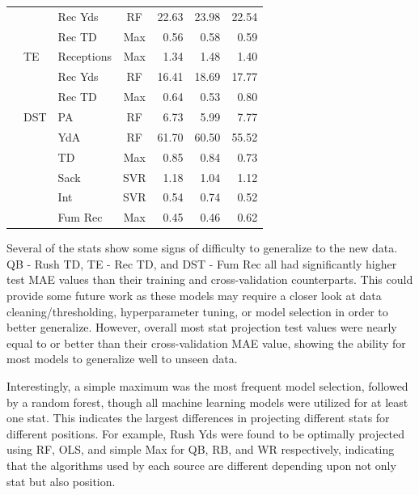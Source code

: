 \documentclass[12pt]{article}
\begin{document}
\begin{table}[H]
\begin{tabular}{lllcrrr}
{} &       {} &     Rec Yds &                  RF &  22.63 &  23.98 &  22.54 \\
{} &       {} &      Rec TD &                 Max &   0.56 &   0.58 &   0.59 \\
\midrule
{} &       TE &  Receptions &                 Max &   1.34 &   1.48 &   1.40 \\
{} &       {} &     Rec Yds &                  RF &  16.41 &  18.69 &  17.77 \\
{} &       {} &      Rec TD &                 Max &   0.64 &   0.53 &   0.80 \\
\midrule
{} &      DST &          PA &                  RF &   6.73 &   5.99 &   7.77 \\
{} &       {} &         YdA &                  RF &  61.70 &  60.50 &  55.52 \\
{} &       {} &          TD &                 Max &   0.85 &   0.84 &   0.73 \\
{} &       {} &        Sack &                 SVR &   1.18 &   1.04 &   1.12 \\
{} &       {} &         Int &                 SVR &   0.54 &   0.74 &   0.52 \\
{} &       {} &     Fum Rec &                 Max &   0.45 &   0.46 &   0.62 \\
\bottomrule
\end{tabular}
\end{table}

Several of the stats show some signs of difficulty to generalize to the new data. QB - Rush TD, TE - Rec TD, and DST - Fum Rec all had significantly higher test MAE values than their training and cross-validation counterparts. This could provide some future work as these models may require a closer look at data cleaning/thresholding, hyperparameter tuning, or model selection in order to better generalize. However, overall most stat projection test values were nearly equal to or better than their cross-validation MAE value, showing the ability for most models to generalize well to unseen data.\bigskip

Interestingly, a simple maximum was the most frequent model selection, followed by a random forest, though all machine learning models were utilized for at least one stat. This indicates the largest differences in projecting different stats for different positions. For example, Rush Yds were found to be optimally projected using RF, OLS, and simple Max for QB, RB, and WR respectively, indicating that the algorithms used by each source are different depending upon not only stat but also position.\bigskip
\end{document}
